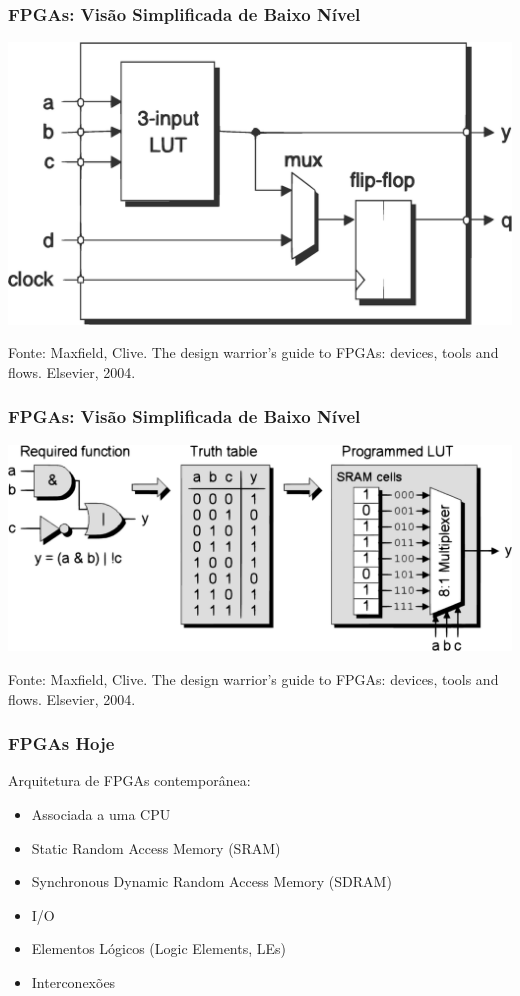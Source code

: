 \documentclass[10pt, compress]{beamer}
\begin{document}
\begin{frame}
    \frametitle{FPGAs: Visão Simplificada de Baixo Nível}
    \begin{center}
        \includegraphics[width=.75\textwidth]{logic-block}
    \end{center}

    \vfill

    \begin{center}
        \scriptsize{Fonte: Maxfield, Clive. The design warrior's guide to FPGAs: devices, tools and flows. Elsevier, 2004.}
    \end{center}
\end{frame}

\begin{frame}
    \frametitle{FPGAs: Visão Simplificada de Baixo Nível}
    \begin{center}
        \includegraphics[width=.76\textwidth]{lut}
    \end{center}

    \vfill

    \begin{center}
        \scriptsize{Fonte: Maxfield, Clive. The design warrior's guide to FPGAs: devices, tools and flows. Elsevier, 2004.}
    \end{center}
\end{frame}

\begin{frame}
    \frametitle{FPGAs Hoje}
    Arquitetura de FPGAs contemporânea:
    \begin{itemize}
        \item Associada a uma \alert{CPU}
        \item Static Random Access Memory (\alert{SRAM})
        \item Synchronous Dynamic Random Access Memory (\alert{SDRAM})
        \item \alert{I/O}
        \item Elementos Lógicos (Logic Elements, \alert{LEs})
        \item Interconexões
    \end{itemize}
\end{frame}
\end{document}
